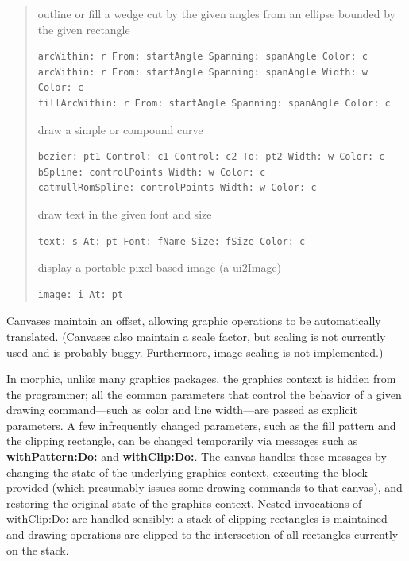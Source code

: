 \documentclass[letterpaper,10pt,english]{sphinxmanual}
\begin{document}
\begin{quote}
outline or fill a wedge cut by the given angles from an ellipse bounded by the given rectangle

\begin{Verbatim}[commandchars=\\\{\}]
arcWithin: r From: startAngle Spanning: spanAngle Color: c
arcWithin: r From: startAngle Spanning: spanAngle Width: w Color: c
fillArcWithin: r From: startAngle Spanning: spanAngle Color: c
\end{Verbatim}

draw a simple or compound curve

\begin{Verbatim}[commandchars=\\\{\}]
bezier: pt1 Control: c1 Control: c2 To: pt2 Width: w Color: c
bSpline: controlPoints Width: w Color: c
catmullRomSpline: controlPoints Width: w Color: c
\end{Verbatim}

draw text in the given font and size

\begin{Verbatim}[commandchars=\\\{\}]
text: s At: pt Font: fName Size: fSize Color: c
\end{Verbatim}

display a portable pixel-based image (a ui2Image)

\begin{Verbatim}[commandchars=\\\{\}]
image: i At: pt
\end{Verbatim}
\end{quote}

Canvases maintain an offset, allowing graphic operations to be automatically translated. (Canvases also maintain a scale factor, but scaling is not currently used and is probably buggy. Furthermore, image scaling is not implemented.)

In morphic, unlike many graphics packages, the graphics context is hidden from the programmer; all the common parameters that control the behavior of a given drawing command—such as color and line width—are passed as explicit parameters. A few infrequently changed parameters, such as the fill pattern and the clipping rectangle, can be changed temporarily via messages such as \textbf{withPattern:Do:} and \textbf{withClip:Do:}. The canvas handles these messages by changing the state of the underlying graphics context, executing the block provided (which presumably issues some drawing commands to that canvas), and restoring the original state of the graphics context. Nested invocations of withClip:Do: are handled sensibly: a stack of clipping rectangles is maintained and drawing operations are clipped to the intersection of all rectangles currently on the stack.
\end{document}
